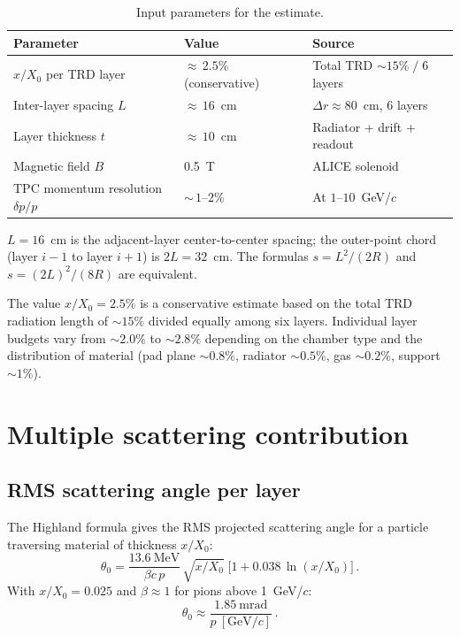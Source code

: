 \documentclass[11pt,a4paper]{article}
\begin{document}
\begin{table}[h]
\centering
\caption{Input parameters for the estimate.}
\label{tab:inputs}
\begin{tabular}{lll}
\toprule
Parameter & Value & Source \\
\midrule
$x/X_0$ per TRD layer & ${\approx}\,2.5\%$ (conservative) & Total TRD ${\sim}15\%\;/\;6$ layers \\
Inter-layer spacing $L$ & ${\approx}\,16$~cm & $\Delta r \approx 80$~cm, 6 layers \\
Layer thickness $t$ & ${\approx}\,10$~cm & Radiator + drift + readout \\
Magnetic field $B$ & 0.5~T & ALICE solenoid \\
TPC momentum resolution $\delta p/p$ & ${\sim}\,1$--$2\%$ & At $1$--$10$~GeV/$c$ \\
\bottomrule
\end{tabular}
\end{table}

\noindent
$L = 16$~cm is the adjacent-layer center-to-center spacing; the
outer-point chord (layer $i{-}1$ to layer $i{+}1$) is $2L = 32$~cm.
The formulas $s = L^2/(2R)$ and $s = (2L)^2/(8R)$ are equivalent.

The value $x/X_0 = 2.5\%$ is a conservative estimate based on the total
TRD radiation length of ${\sim}15\%$ divided equally among six layers.
Individual layer budgets vary from ${\sim}2.0\%$ to ${\sim}2.8\%$
depending on the chamber type and the distribution of material
(pad plane ${\sim}0.8\%$, radiator ${\sim}0.5\%$, gas ${\sim}0.2\%$,
support ${\sim}1\%$).

\section{Multiple scattering contribution}

\subsection{RMS scattering angle per layer}

The Highland formula gives the RMS projected scattering angle for a
particle traversing material of thickness $x/X_0$:
\begin{equation}
\label{eq:highland}
\theta_0 = \frac{13.6~\mathrm{MeV}}{\beta c\,p}\,
\sqrt{x/X_0}\;\bigl[1 + 0.038\,\ln(x/X_0)\bigr]\,.
\end{equation}
With $x/X_0 = 0.025$ and $\beta \approx 1$ for pions above 1~GeV/$c$:
\begin{equation}
\theta_0 \approx \frac{1.85~\mathrm{mrad}}{p~[\mathrm{GeV}/c]}\,.
\end{equation}
\end{document}
